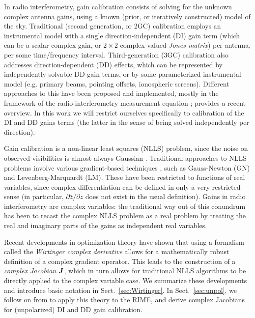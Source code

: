 \documentclass[useAMS,usenatbib]{mn2e}
\newcommand{\mat}[1]{{\bmath{#1}}}
\newcommand{\JJ}{\mat{J}} %
\begin{document}
In radio interferometry, gain calibration consists of solving for the unknown complex antenna gains,
using a known (prior, or iteratively constructed) model of the sky. Traditional (second generation, or 2GC)
calibration employs an instrumental model with a single direction-independent (DI) gain term (which
can be a scalar complex gain, or $2\times2$ complex-valued {\em Jones matrix}) per antenna, per some 
time/frequency interval. Third-generation (3GC) calibration also addresses direction-dependent (DD) effects, which can be 
represented by independently solvable DD gain terms, or by some parameterized instrumental 
model (e.g. primary beams, pointing offsets, ionospheric screens). Different approaches to 
this have been proposed and implemented, mostly in the framework of the radio interferometry measurement equation
\citep[RIME, see][]{ME1}; \citet{RRIME1,RRIME2,RRIME3} provides a recent overview. In this work we will restrict 
ourselves specifically to calibration of the DI and DD gains terms (the latter in the sense of being solved independently
per direction).

Gain calibration is a non-linear least squares (NLLS) problem, since the noise on observed visibilities is 
almost always Gaussian \citep[though other treatments have been proposed by][]{Kazemi2013a}. Traditional approaches
to NLLS problems involve various gradient-based techniques \citep[for an overview, see][]{Madsen-NLLS}, such as 
Gauss-Newton (GN) and Levenberg-Marquardt (LM). These have been restricted to functions of real variables, 
since complex differentiation can be defined in only a very restricted sense (in particular, $\partial\bar z/\partial z$
does not exist in the usual definition). Gains in radio interferometry are complex variables: the traditional 
way out of this conundrum has been to recast the complex NLLS problem as a real problem by treating the real 
and imaginary parts of the gains as independent real variables.

Recent developments in optimization theory \citep{ComplexOpt} have shown that using a formalism 
called the {\em Wirtinger complex derivative} allows for a mathematically robust definition of a 
complex gradient operator. This leads to the construction of a {\em complex Jacobian}  $\JJ$, which in turn allows for traditional 
NLLS algorithms to be directly applied to the complex variable case. We summarize these developments and 
introduce basic notation in Sect.~\ref{sec:Wirtinger}. In Sect.~\ref{sec:unpol}, we follow on from \citet{Tasse-cohjones}
to apply this theory to the RIME, and derive complex Jacobians for (unpolarized) DI and DD gain calibration.
\end{document}
